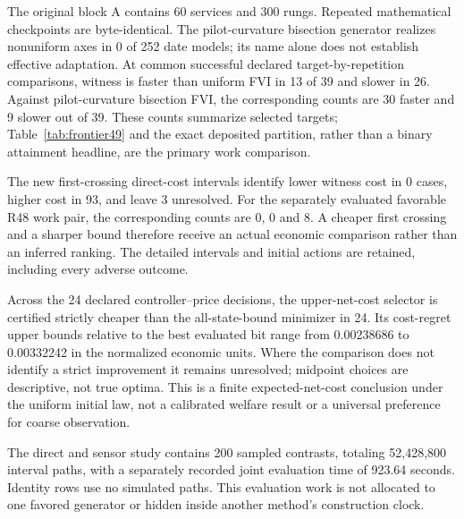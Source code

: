 The original block A contains 60 services and 300 rungs. Repeated mathematical checkpoints are byte-identical. The pilot-curvature bisection generator realizes nonuniform axes in 0 of 252 date models; its name alone does not establish effective adaptation. At common successful declared target-by-repetition comparisons, witness is faster than uniform FVI in 13 of 39 and slower in 26. Against pilot-curvature bisection FVI, the corresponding counts are 30 faster and 9 slower out of 39. These counts summarize selected targets; Table~\ref{tab:frontier49} and the exact deposited partition, rather than a binary attainment headline, are the primary work comparison.

The new first-crossing direct-cost intervals identify lower witness cost in 0 cases, higher cost in 93, and leave 3 unresolved. For the separately evaluated favorable R48 work pair, the corresponding counts are 0, 0 and 8. A cheaper first crossing and a sharper bound therefore receive an actual economic comparison rather than an inferred ranking. The detailed intervals and initial actions are retained, including every adverse outcome.

Across the 24 declared controller--price decisions, the upper-net-cost selector is certified strictly cheaper than the all-state-bound minimizer in 24. Its cost-regret upper bounds relative to the best evaluated bit range from 0.00238686 to 0.00332242 in the normalized economic units. Where the comparison does not identify a strict improvement it remains unresolved; midpoint choices are descriptive, not true optima. This is a finite expected-net-cost conclusion under the uniform initial law, not a calibrated welfare result or a universal preference for coarse observation.

The direct and sensor study contains 200 sampled contrasts, totaling 52,428,800 interval paths, with a separately recorded joint evaluation time of 923.64 seconds. Identity rows use no simulated paths. This evaluation work is not allocated to one favored generator or hidden inside another method's construction clock.
